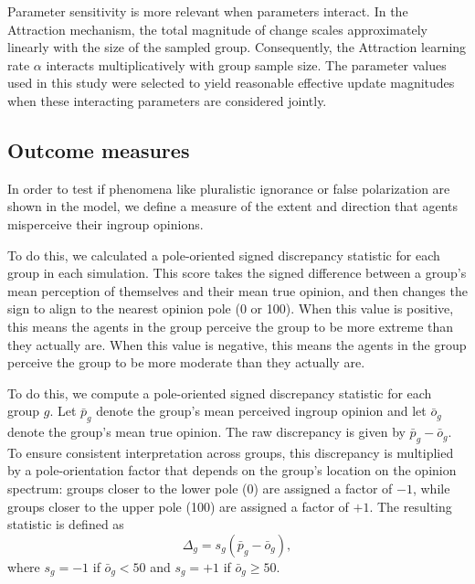 Parameter sensitivity is more relevant when parameters interact. In the Attraction mechanism, the total magnitude of change scales approximately linearly with the size of the sampled group. Consequently, the Attraction learning rate $\alpha$ interacts multiplicatively with group sample size. The parameter values used in this study were selected to yield reasonable effective update magnitudes when these interacting parameters are considered jointly.

\subsection{Outcome measures}

In order to test if phenomena like pluralistic ignorance or false polarization are shown in the model, we define a measure of the extent and direction that agents misperceive their ingroup opinions. 

To do this, we calculated a pole-oriented signed discrepancy statistic for each group in each simulation. This score takes the signed difference between a group's mean perception of themselves and their mean true opinion, and then changes the sign to align to the nearest opinion pole (0 or 100). When this value is positive, this means the agents in the group perceive the group to be more extreme than they actually are. When this value is negative, this means the agents in the group perceive the group to be more moderate than they actually are. 

To do this, we compute a pole-oriented signed discrepancy statistic for each group $g$. Let $\bar{p}_g$ denote the group's mean perceived ingroup opinion and let $\bar{o}_g$ denote the group's mean true opinion. The raw discrepancy is given by $\bar{p}_g - \bar{o}_g$. To ensure consistent interpretation across groups, this discrepancy is multiplied by a pole-orientation factor that depends on the group's location on the opinion spectrum: groups closer to the lower pole (0) are assigned a factor of $-1$, while groups closer to the upper pole (100) are assigned a factor of $+1$. The resulting statistic is defined as
\[
\Delta_g = s_g (\bar{p}_g - \bar{o}_g),
\]
where $s_g = -1$ if $\bar{o}_g < 50$ and $s_g = +1$ if $\bar{o}_g \ge 50$. 


